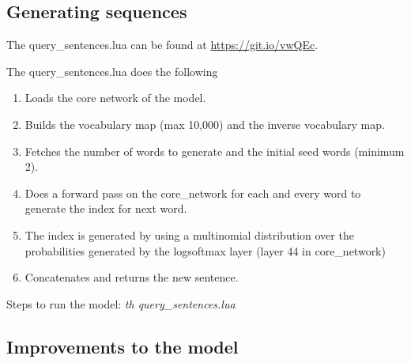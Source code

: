 \documentclass{article}
\begin{document}
\subsection{Generating sequences}
The query\_sentences.lua can be found at \url{https://git.io/vwQEc}.

The query\_sentences.lua does the following
\begin{enumerate}
  \item Loads the core network of the model.
  \item Builds the vocabulary map (max 10,000) and the inverse vocabulary map.
  \item Fetches the number of words to generate and the initial seed words (minimum 2).
  \item Does a forward pass on the core\_network for each and every word to generate the index for next word.
  \item The index is generated by using a multinomial distribution over the probabilities generated by the logsoftmax layer (layer 44 in core\_network)
  \item Concatenates and returns the new sentence.
\end{enumerate}

Steps to run the model:  \textit{th query\_sentences.lua}

\subsection{Improvements to the model}
\end{document}
